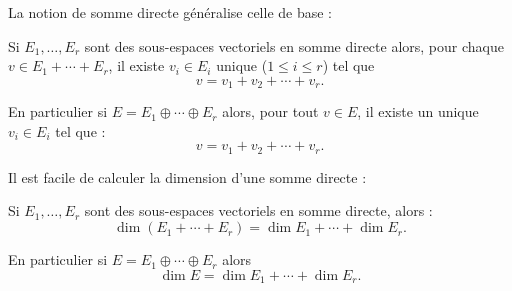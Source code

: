 \documentclass[12pt, class=report,crop=false]{standalone}
\begin{document}
La notion de somme directe généralise celle de base :
\begin{proposition}
Si $E_1,\ldots,E_r$ sont des sous-espaces vectoriels en somme directe alors, pour chaque 
$v \in E_1 + \cdots +E_r$, il existe $v_i \in E_i$ unique ($1\le i \le r$) tel que 
$$v = v_1+v_2+\cdots+v_r.$$

\end{proposition}
En particulier si $E = E_1 \oplus \cdots \oplus E_r$ alors, pour tout  
$v \in E$, il existe un unique $v_i \in E_i$ tel que :
$$v = v_1+v_2+\cdots+v_r.$$


Il est facile de calculer la dimension d'une somme directe :
\begin{proposition}
Si $E_1,\ldots,E_r$ sont des sous-espaces vectoriels en somme directe, alors :
\[\dim (E_1 + \cdots +E_r) = \dim E_1 +\cdots+\dim E_r .\]
\end{proposition}
En particulier si $E = E_1 \oplus \cdots \oplus E_r$ alors 
\[\dim E  = \dim E_1 +\cdots+\dim E_r .\]
\end{document}
